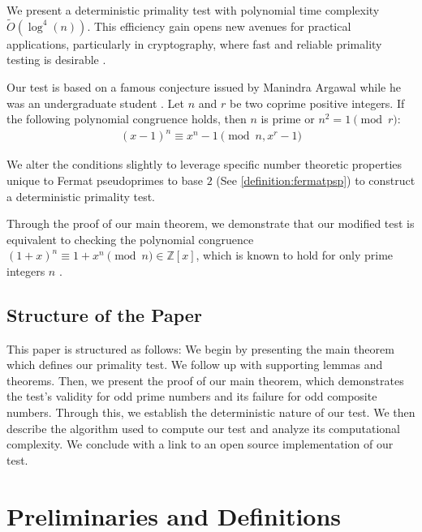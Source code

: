 \documentclass{article}
\theoremstyle{plain}
\theoremstyle{definition}
\newcommand{\softO}[1]{\tilde{O}(#1)}
\begin{document}
We present a deterministic primality test with polynomial time complexity $\softO{\log^4(n)}$. This efficiency gain opens new avenues for practical applications, particularly in cryptography, where fast and reliable primality testing is desirable \cite{pomerance1984}.

Our test is based on a famous conjecture issued by Manindra Argawal while he was an undergraduate student \cite{aks2002}. Let $n$ and $r$ be two coprime positive integers. If the following polynomial congruence holds, then $n$ is prime or $n^2 = 1 \pmod{r}$:
\begin{align}
    (x - 1)^n \equiv x^n - 1 \pmod{n, x^r - 1}
\end{align}

We alter the conditions slightly to leverage specific number theoretic properties unique to Fermat pseudoprimes to base $2$ (See \cref{definition:fermatpsp}) to construct a deterministic primality test.

Through the proof of our main theorem, we demonstrate that our modified test is equivalent to checking the polynomial congruence $(1 + x)^n \equiv 1 + x^n \pmod{n} \in \mathbb{Z}[x]$, which is known to hold for only prime integers $n$ \cite{granville2004primes}.

\subsection{Structure of the Paper}
This paper is structured as follows: We begin by presenting the main theorem which defines our primality test. We follow up with supporting lemmas and theorems. Then, we present the proof of our main theorem, which demonstrates the test's validity for odd prime numbers and its failure for odd composite numbers. Through this, we establish the deterministic nature of our test. We then describe the algorithm used to compute our test and analyze its computational complexity. We conclude with a link to an open source implementation of our test.

\section{Preliminaries and Definitions}
\end{document}
